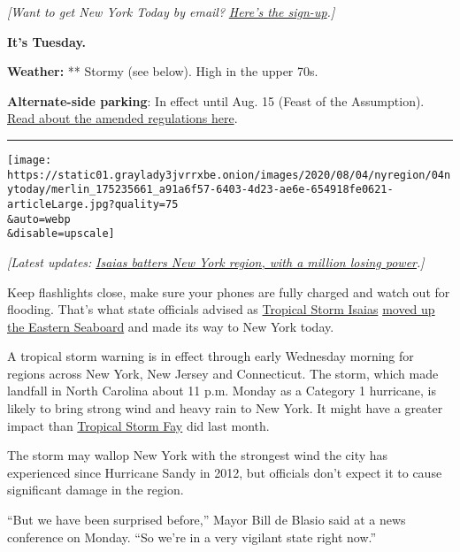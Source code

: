 \emph{{[}Want to get New York Today by email?}
\href{https://www.nytimes3xbfgragh.onion/newsletters/newyorktoday}{\emph{Here's
the sign-up}}\emph{.{]}}

\textbf{It's Tuesday.}

\textbf{Weather:} ** Stormy (see below). High in the upper 70s.

\textbf{Alternate-side parking}: In effect until Aug. 15 (Feast of the
Assumption).
\href{https://www1.nyc.gov/html/dot/html/motorist/alternate-side-parking.shtml\#reform}{Read
about the amended regulations here}.

\begin{center}\rule{0.5\linewidth}{\linethickness}\end{center}

\texttt{[image: https://static01.graylady3jvrrxbe.onion/images/2020/08/04/nyregion/04nytoday/merlin\_175235661\_a91a6f57-6403-4d23-ae6e-654918fe0621-articleLarge.jpg?quality=75\\\&auto=webp\\\&disable=upscale]}

\emph{{[}Latest updates:}
\href{https://www.nytimes3xbfgragh.onion/2020/08/04/nyregion/nj-ny-Isaias-hurricane-storm.html}{\emph{Isaias
batters New York region, with a million losing power}}\emph{.{]}}

Keep flashlights close, make sure your phones are fully charged and
watch out for flooding. That's what state officials advised as
\href{https://www.nytimes3xbfgragh.onion/2020/08/04/us/isaias-storm-updates.html}{Tropical
Storm Isaias}
\href{https://www.nytimes3xbfgragh.onion/interactive/2020/07/31/us/hurricane-isaias-tracker-map.html}{moved
up the Eastern Seaboard} and made its way to New York today.

A tropical storm warning is in effect through early Wednesday morning
for regions across New York, New Jersey and Connecticut. The storm,
which made landfall in North Carolina about 11 p.m. Monday as a Category
1 hurricane, is likely to bring strong wind and heavy rain to New York.
It might have a greater impact than
\href{https://www.nytimes3xbfgragh.onion/2020/07/10/nyregion/tropical-storm-fay-nyc.html}{Tropical
Storm Fay} did last month.

The storm may wallop New York with the strongest wind the city has
experienced since Hurricane Sandy in 2012, but officials don't expect it
to cause significant damage in the region.

``But we have been surprised before,'' Mayor Bill de Blasio said at a
news conference on Monday. ``So we're in a very vigilant state right
now.''

